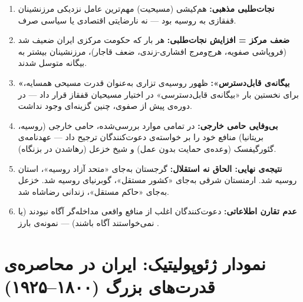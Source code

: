 \begin{tcolorbox}[wavebox, title={الگوهای کلیدی دوره‌ی صفوی-قاجار}]
\begin{enumerate}[nosep, label=\textbf{الگوی \arabic*:}]
  \item \textbf{نجات‌طلبی مذهبی:} هم‌کیشی (مسیحیت) مهم‌ترین عامل نزدیکی مرزنشینان قفقازی به روسیه بود — نه نارضایتی اقتصادی یا سیاسی صرف. \\[4pt]

  \item \textbf{ضعف مرکز = افزایش نجات‌طلبی:} هر بار که حکومت مرکزی ایران ضعیف شد (فروپاشی صفویه، هرج‌ومرج افشاری-زندی، ضعف قاجار)، مرزنشینان بیشتر به بیگانه متوسل شدند. \\[4pt]

  \item \textbf{«بیگانه‌ی قابل‌دسترس»:} ظهور روسیه‌ی تزاری به‌عنوان قدرت مسیحی همسایه، برای نخستین بار «بیگانه‌ی قابل‌دسترسی» در اختیار مسیحیان قفقاز قرار داد — در دوره‌ی پیش از صفوی، چنین گزینه‌ای وجود نداشت. \\[4pt]

  \item \textbf{بی‌وفایی حامی خارجی:} در تمامی موارد بررسی‌شده، حامی خارجی (روسیه، بریتانیا) منافع خود را بر خواسته‌ی دعوت‌کنندگان ترجیح داد — عهدنامه‌ی گئورگیفسک (وعده‌ی حمایت بدون عمل) و شیخ خزعل (رهاشدن در بزنگاه). \\[4pt]

  \item \textbf{نتیجه‌ی نهایی: الحاق نه استقلال:} گرجستان به‌جای «متحد آزاد روسیه»، استان روسیه شد. ارمنستان شرقی به‌جای «کشور مستقل»، گوبرنیای روسیه شد. خزعل به‌جای «حاکم مستقل»، زندانی رضاشاه شد. \\[4pt]

  \item \textbf{عدم تقارن اطلاعاتی:} دعوت‌کنندگان اغلب از منافع واقعی مداخله‌گر آگاه نبودند (یا نمی‌خواستند آگاه باشند) — نمونه‌ی بارز .
\end{enumerate}
\end{tcolorbox}

\section{نمودار ژئوپولیتیک: ایران در محاصره‌ی قدرت‌های بزرگ (۱۸۰۰–۱۹۲۵)}
\label{sec:ch06-geopolitical}

